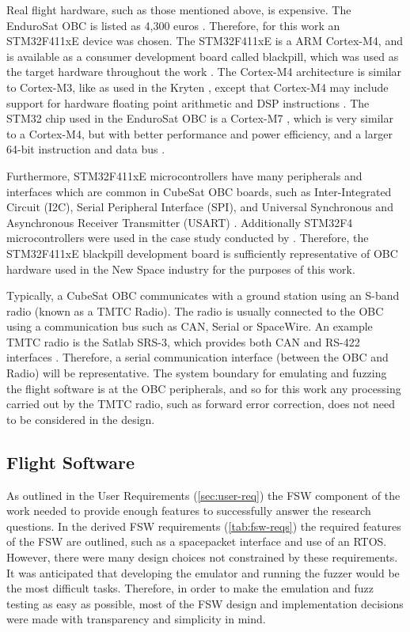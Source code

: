 \documentclass[../report.tex]{subfiles}
\begin{document}
Real flight hardware, such as those mentioned above, is expensive. The
EnduroSat OBC is listed as 4,300 euros \citep{EnduroSat_OBC}. Therefore, for
this work an STM32F411xE device was chosen. The STM32F411xE is a ARM Cortex-M4, and
is available as a consumer development board called blackpill, which was used
as the target hardware throughout the work \citep{blackpill_info}. The
Cortex-M4 architecture is similar to Cortex-M3, like as used in the Kryten
\citep{Clydespace_Kryten}, except that Cortex-M4 may include support for
hardware floating point arithmetic and DSP instructions \citep{Cortex_M3}
\citep{Cortex_M4}. The STM32 chip used in the EnduroSat OBC is a Cortex-M7
\citep{EnduroSat_OBC}, which is very similar to a Cortex-M4, but with better
performance and power efficiency, and a larger 64-bit instruction and data bus
\citep{Cortex_M7}.

Furthermore, STM32F411xE microcontrollers have many peripherals and interfaces
which are common in CubeSat OBC boards, such as Inter-Integrated Circuit (I2C),
Serial Peripheral Interface (SPI), and Universal Synchronous and Asynchronous
Receiver Transmitter (USART) \citep{Cratere_2024}. Additionally STM32F4
microcontrollers were used in the case study conducted by
\citet{Scharnowski_2023}. Therefore, the STM32F411xE blackpill development board
is sufficiently representative of OBC hardware used in the New Space industry
for the purposes of this work.

Typically, a CubeSat OBC communicates with a ground station using an S-band
radio (known as a TMTC Radio). The radio is usually connected to the OBC using
a communication bus such as CAN, Serial or SpaceWire. An example TMTC radio is
the Satlab SRS-3, which provides both CAN and RS-422 interfaces
\citep{Satlab_SRS3}. Therefore, a serial communication interface (between the
OBC and Radio) will be representative. The system boundary for emulating and
fuzzing the flight software is at the OBC peripherals, and so for this work any
processing carried out by the TMTC radio, such as forward error correction, does
not need to be considered in the design.

\subsection{Flight Software} \label{sec:fsw-design}

As outlined in the User Requirements (\autoref{sec:user-req}) the FSW component
of the work needed to provide enough features to successfully answer the
research questions. In the derived FSW requirements (\autoref{tab:fsw-reqs})
the required features of the FSW are outlined, such as a spacepacket interface
and use of an RTOS. However, there were many design choices not constrained
by these requirements. It was anticipated that developing the emulator and
running the fuzzer would be the most difficult tasks. Therefore, in order to
make the emulation and fuzz testing as easy as possible, most of the FSW design
and implementation decisions were made with transparency and simplicity in
mind.
\end{document}
